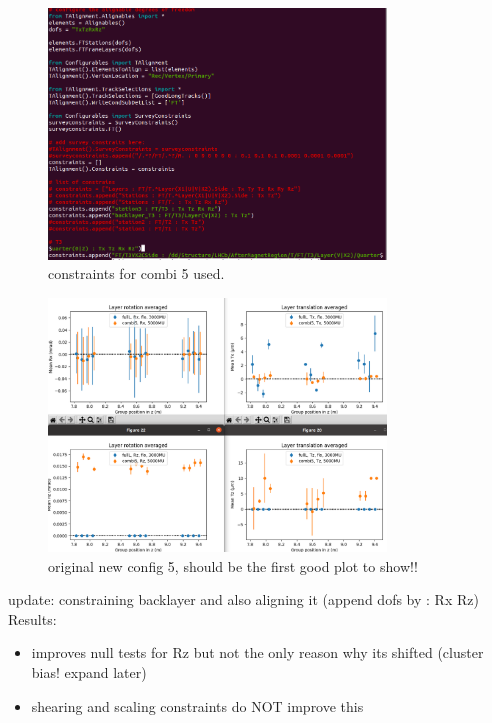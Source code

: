\begin{figure}
  \centering
  \includegraphics[width=0.8\textwidth]{plots/august_13/new_combi5_config.png}
  \caption{constraints for combi 5 used.}
  \label{fig:constraints_c5}
\end{figure}

\begin{figure}
  \centering
  \includegraphics[width=0.8\textwidth]{plots/august_13/newCombi5.png}
  \caption{original new config 5, should be the first good plot to show!!}
  \label{fig:OGconfig5}
\end{figure}

update: constraining backlayer and also aligning it (append dofs by : Rx Rz)
Results: \\
\begin{itemize}
  \item improves null tests for Rz but not the only reason why its shifted (cluster bias! expand later)
  \item shearing and scaling constraints do NOT improve this
\end{itemize}

